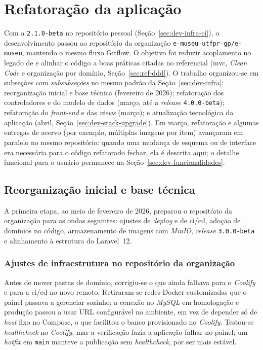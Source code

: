 \section{Refatoração da aplicação}\label{sec:dev-refatoracao}

Com a \texttt{2.1.0-beta} no repositório pessoal (Seção~\ref{sec:dev-infra-ci}), o desenvolvimento passou ao repositório da organização \texttt{e-museu-utfpr-gp/e-museu}, mantendo o mesmo fluxo Gitflow. O objetivo foi reduzir acoplamento no legado de  e alinhar o código a boas práticas citadas no referencial (\acrshort{mvc}, \textit{Clean Code} e organização por domínio, Seção~\ref{sec:ref-ddd}). O trabalho organizou-se em subseções com \textit{subsubseções} no mesmo padrão da Seção~\ref{sec:dev-infra}: reorganização inicial e base técnica (fevereiro de 2026); refatoração dos controladores e do modelo de dados (março, até a \textit{release} \texttt{4.0.0-beta}); refatoração do \textit{front-end} e das \textit{views} (março); e atualização tecnológica da aplicação (abril, Seção~\ref{sec:dev-stack-upgrade}). Em março, refatoração e algumas entregas de acervo (por exemplo, múltiplas imagens por item) avançaram em paralelo no mesmo repositório: quando uma mudança de esquema ou de interface era necessária para o código refatorado fechar, ela é descrita aqui; o detalhe funcional para o usuário permanece na Seção~\ref{sec:dev-funcionalidades}.


\subsection{Reorganização inicial e base técnica}\label{sec:dev-refatoracao-inicial}

A primeira etapa, ao meio de fevereiro de 2026, preparou o repositório da organização para as ondas seguintes: ajustes de \textit{deploy} e de \acrfull{ci/cd}, adoção de domínios no código, armazenamento de imagens com \textit{MinIO}, \textit{release} \texttt{3.0.0-beta} e alinhamento à estrutura do Laravel~12.


\subsubsection{Ajustes de infraestrutura no repositório da organização}\label{sec:dev-refatoracao-infra-org}

Antes de mover pastas de domínio, corrigiu-se o que ainda falhava para o \textit{Coolify} e para a \acrfull{ci/cd} no novo remoto. Retiraram-se redes Docker customizadas que o painel passava a gerenciar sozinho; a conexão ao \textit{MySQL} em homologação e produção passou a usar URL configurável no ambiente, em vez de depender só de \textit{host} fixo no Compose, o que facilitou o banco provisionado no \textit{Coolify}. Testou-se \textit{healthcheck} no \textit{Coolify}, mas a verificação fazia a aplicação falhar no painel; um \textit{hotfix} em \texttt{main} manteve a publicação sem \textit{healthcheck}, por ser mais estável.

